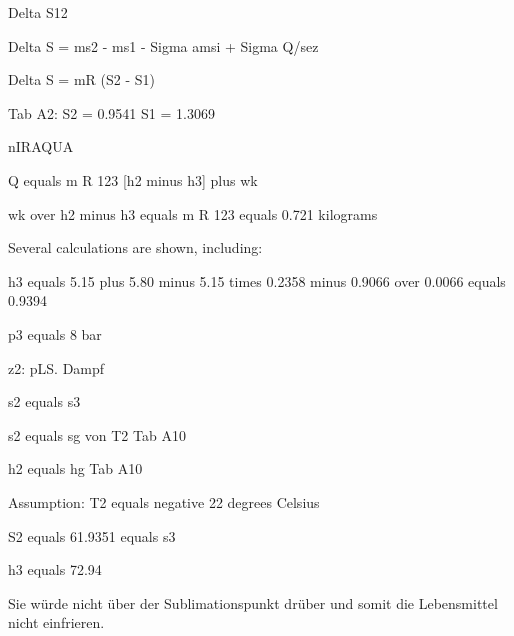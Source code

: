 Delta S12  

Delta S = ms2 - ms1 - Sigma amsi + Sigma Q/sez  

Delta S = mR (S2 - S1)  

Tab A2:  
S2 = 0.9541  
S1 = 1.3069

nIRAQUA

Q equals m R 123 [h2 minus h3] plus wk

wk over h2 minus h3 equals m R 123 equals 0.721 kilograms

Several calculations are shown, including:

h3 equals 5.15 plus 5.80 minus 5.15 times 0.2358 minus 0.9066 over 0.0066 equals 0.9394

p3 equals 8 bar

z2: pLS. Dampf

s2 equals s3

s2 equals sg von T2 Tab A10

h2 equals hg Tab A10

Assumption: T2 equals negative 22 degrees Celsius

S2 equals 61.9351 equals s3

h3 equals 72.94

Sie würde nicht über der Sublimationspunkt drüber und somit die Lebensmittel nicht einfrieren.